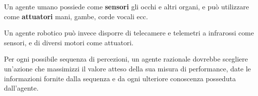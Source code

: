 \documentclass[a4paper, 12pt]{book}
\begin{document}
    Un agente umano possiede come \textbf{sensori} gli occhi e altri organi, e può utilizzare come \textbf{attuatori} mani, gambe, corde vocali ecc.

    Un agente robotico può invece disporre di telecamere e telemetri a infrarossi come sensori, e di diversi motori come attuatori.


    \begin{tcolorbox}[
      colback=cyan!5!white,
      colframe=blue!50!black,
      title=\textbf{Definizione formale di agente razionale},
      coltitle=white,
      fonttitle=\bfseries,
      arc=3mm,
      boxrule=0.5pt,
      enhanced,
      breakable
    ]
      Per ogni possibile sequenza di percezioni, un agente razionale dovrebbe scegliere un’azione che massimizzi il valore atteso della sua misura di performance, date le informazioni fornite dalla sequenza e da ogni ulteriore conoscenza posseduta dall’agente.
    \end{tcolorbox}
\end{document}
